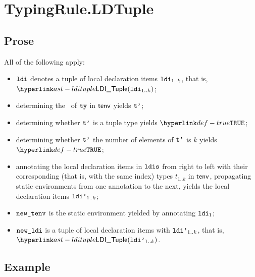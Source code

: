 \section{TypingRule.LDTuple\label{sec:TypingRule.LDTuple}}
\subsection{Prose}
All of the following apply:
\begin{itemize}
  \item $\texttt{ldi}$ denotes a tuple of local declaration items $\texttt{ldi}_{1..k}$, that is, $\LDITuple(\ldi_{1..k})$;
  \item determining the \structure\ of $\texttt{ty}$ in $\textsf{tenv}$ yields $\texttt{t'}$\ProseOrTypeError;
  \item determining whether $\texttt{t'}$ is a tuple type yields $\True$\ProseOrTypeError;
  \item determining whether $\texttt{t'}$ the number of elements of $\texttt{t'}$ is $k$ yields $\True$\ProseOrTypeError;
  \item annotating the local declaration items in $\texttt{ldis}$ from right to left with their corresponding
        (that is, with the same index) types $t_{1..k}$ in $\textsf{tenv}$,
        propagating static environments from one annotation to the next,
        yields the local declaration items $\texttt{ldi'}_{1..k}$\ProseOrTypeError;
  \item $\texttt{new\_tenv}$ is the static environment yielded by annotating $\texttt{ldi}_1$;
  \item $\texttt{new\_ldi}$ is a tuple of local declaration items with $\texttt{ldi'}_{1..k}$, that is, \\
        $\LDITuple(\ldip_{1..k})$.
\end{itemize}

\subsection{Example}


